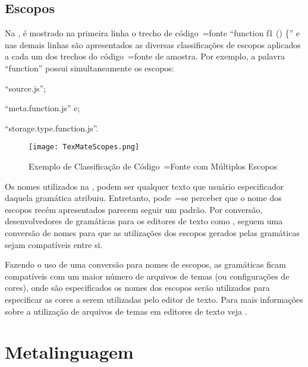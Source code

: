 \subsection{Escopos}

Na ,
é mostrado na primeira linha o trecho de código~=fonte ``function f1 () \{'' e
nas demais linhas são apresentados as diversas classificações de escopos aplicados a cada um dos trechos do código~=fonte de amostra.
Por exemplo,
a palavra ``function'' possui simultaneamente os escopos:
\begin{inparaenum}[1)]
\item ``source.js'';
\item ``meta.function.js'' e;
\item ``storage.type.function.js''.
\end{inparaenum}%
\begin{figure}[!htb]
\caption{Exemplo de Classificação de Código~=Fonte com Múltiplos Escopos}
\label{TexMateScopes}
\centering
\texttt{[image: TexMateScopes.png]}
\end{figure}

Os nomes utilizados na ,
podem ser qualquer texto que usuário especificador daquela gramática atribuiu.
Entretanto,
pode~=se perceber que o nome dos escopos recém apresentados parecem seguir um padrão.
Por conversão,
desenvolvedores de gramáticas para os editores de texto como ,
seguem uma conversão de nomes para que as utilizações dos escopos gerados pelas gramáticas sejam compatíveis entre si.

Fazendo o uso de uma conversão para nomes de escopos,
as gramáticas ficam compatíveis com um maior número de arquivos de temas (ou configurações de cores),
onde são especificados os nomes dos escopos serão utilizados para especificar as cores a serem utilizadas pelo editor de texto.
Para mais informações sobre a utilização de arquivos de temas em editores de texto veja .


\section{Metalinguagem}
\label{metalinguagemGrammar}

